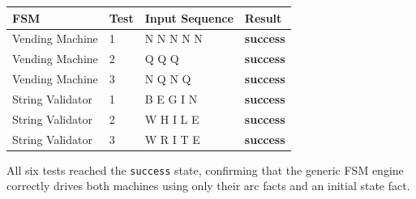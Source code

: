 \documentclass[12pt,a4paper]{article}
\begin{document}
\begin{center}
\begin{tabular}{llll}
\toprule
\textbf{FSM} & \textbf{Test} & \textbf{Input Sequence} & \textbf{Result} \\
\midrule
Vending Machine & 1 & N N N N N       & \textcolor{successgreen}{\textbf{success}} \\
Vending Machine & 2 & Q Q Q           & \textcolor{successgreen}{\textbf{success}} \\
Vending Machine & 3 & N Q N Q         & \textcolor{successgreen}{\textbf{success}} \\
\midrule
String Validator & 1 & B E G I N      & \textcolor{successgreen}{\textbf{success}} \\
String Validator & 2 & W H I L E      & \textcolor{successgreen}{\textbf{success}} \\
String Validator & 3 & W R I T E      & \textcolor{successgreen}{\textbf{success}} \\
\bottomrule
\end{tabular}
\end{center}

\vspace{1em}
All six tests reached the \texttt{success} state, confirming that the generic
FSM engine correctly drives both machines using only their arc facts and an
initial state fact.
\end{document}
